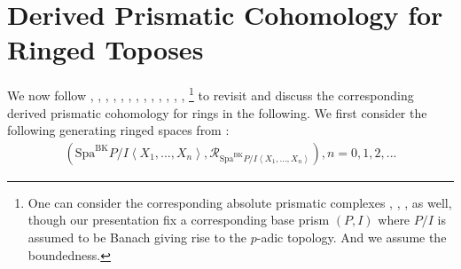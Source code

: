 \documentclass[12pt]{book}
\begin{document}
\chapter{Derived Prismatic Cohomology for Ringed Toposes}


We now follow \cite{Grot1}, \cite{Grot2}, \cite{Grot3}, \cite{Grot4}, \cite{BK}, \cite{BBK}, \cite{BBBK}, \cite{BBM}, \cite{KKM}, \cite{T2}, \cite{Sch2}, \cite{BS}, \cite{BL}, \cite{Dr1}\footnote{One can consider the corresponding absolute prismatic complexes \cite{BS}, \cite{BL2}, \cite{BL}, \cite{Dr1} as well, though our presentation fix a corresponding base prism $(P,I)$ where $P/I$ is assumed to be Banach giving rise to the $p$-adic topology. And we assume the boundedness.} to revisit and discuss the corresponding derived prismatic cohomology for rings in the following. We first consider the following generating ringed spaces from \cite{BK}:
\begin{align}
(\mathrm{Spa}^\mathrm{BK}P/I\left<X_1,...,X_n\right>,\mathcal{R}_{\mathrm{Spa}^\mathrm{BK}P/I\left<X_1,...,X_n\right>}),n=0,1,2,...
\end{align}
\end{document}
